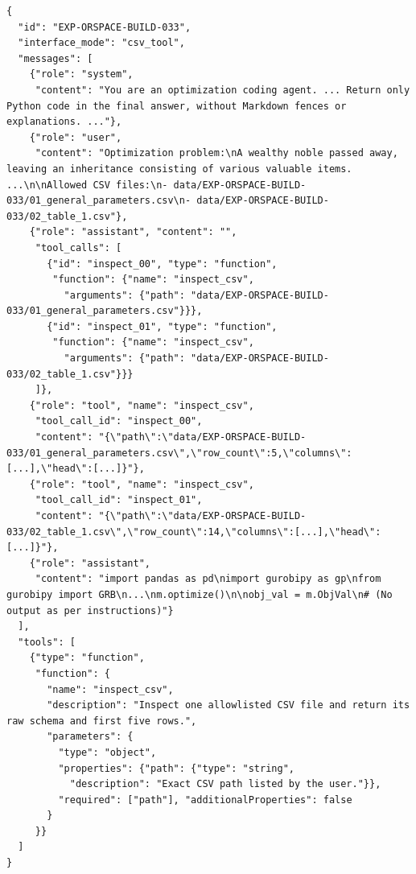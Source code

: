 \documentclass[11pt]{article}
\begin{document}
\begin{enumerate}[label=(R2.Major.\arabic*),leftmargin=*]
\begin{tcolorbox}[colback=white,colframe=boxgrey,coltitle=white,coltext=black,title=SFT Data Format,breakable,fonttitle=\bfseries,fontupper=\small,before upper={\lstdefinestyle{sftrecord}{basicstyle=\footnotesize\ttfamily,breaklines=true,breakatwhitespace=false,columns=fullflexible,keepspaces=true,showstringspaces=false,aboveskip=4pt,belowskip=4pt}}]
\begin{lstlisting}[style=sftrecord]
{
  "id": "EXP-ORSPACE-BUILD-033",
  "interface_mode": "csv_tool",
  "messages": [
    {"role": "system",
     "content": "You are an optimization coding agent. ... Return only Python code in the final answer, without Markdown fences or explanations. ..."},
    {"role": "user",
     "content": "Optimization problem:\nA wealthy noble passed away, leaving an inheritance consisting of various valuable items. ...\n\nAllowed CSV files:\n- data/EXP-ORSPACE-BUILD-033/01_general_parameters.csv\n- data/EXP-ORSPACE-BUILD-033/02_table_1.csv"},
    {"role": "assistant", "content": "",
     "tool_calls": [
       {"id": "inspect_00", "type": "function",
        "function": {"name": "inspect_csv",
          "arguments": {"path": "data/EXP-ORSPACE-BUILD-033/01_general_parameters.csv"}}},
       {"id": "inspect_01", "type": "function",
        "function": {"name": "inspect_csv",
          "arguments": {"path": "data/EXP-ORSPACE-BUILD-033/02_table_1.csv"}}}
     ]},
    {"role": "tool", "name": "inspect_csv",
     "tool_call_id": "inspect_00",
     "content": "{\"path\":\"data/EXP-ORSPACE-BUILD-033/01_general_parameters.csv\",\"row_count\":5,\"columns\":[...],\"head\":[...]}"},
    {"role": "tool", "name": "inspect_csv",
     "tool_call_id": "inspect_01",
     "content": "{\"path\":\"data/EXP-ORSPACE-BUILD-033/02_table_1.csv\",\"row_count\":14,\"columns\":[...],\"head\":[...]}"},
    {"role": "assistant",
     "content": "import pandas as pd\nimport gurobipy as gp\nfrom gurobipy import GRB\n...\nm.optimize()\n\nobj_val = m.ObjVal\n# (No output as per instructions)"}
  ],
  "tools": [
    {"type": "function",
     "function": {
       "name": "inspect_csv",
       "description": "Inspect one allowlisted CSV file and return its raw schema and first five rows.",
       "parameters": {
         "type": "object",
         "properties": {"path": {"type": "string",
           "description": "Exact CSV path listed by the user."}},
         "required": ["path"], "additionalProperties": false
       }
     }}
  ]
}
\end{lstlisting}
\end{tcolorbox}


\end{enumerate}
\end{document}
